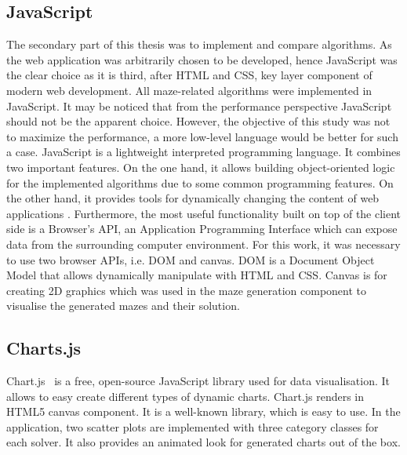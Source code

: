 \subsection{JavaScript}
The secondary part of this thesis was to implement and compare algorithms. As the web application was arbitrarily chosen to be developed, hence JavaScript was the 
clear choice as it is third, after HTML and CSS, key layer component of modern web development. All maze-related algorithms were implemented in JavaScript.
It may be noticed that from the performance perspective JavaScript should not be the apparent choice. However, the objective of this study was not to maximize
the performance, a more low-level language would be better for such a case. JavaScript is a lightweight interpreted programming language. 
It combines two important features. On the one hand, it allows building object-oriented logic for the implemented algorithms due to some common programming
features. On the other hand, it provides tools for dynamically changing the content of web applications \cite{29}. Furthermore, the most useful functionality built on top
of the client side is a Browser's API, an Application Programming Interface which can expose data from the surrounding computer environment. For this work, it was necessary to use two browser APIs, i.e. DOM and canvas. DOM is a Document Object Model that allows dynamically manipulate with HTML and CSS.
Canvas is for creating 2D graphics which was used in the maze generation component to visualise the generated mazes and their solution. 
\subsection{Charts.js}
Chart.js~\cite{30} is a free, open-source JavaScript library used for data visualisation. It allows to easy create different types of dynamic charts. Chart.js renders in 
HTML5 canvas component. It is a well-known library, which is easy to use. In the application, two scatter plots are implemented with three category classes 
for each solver. It also provides an animated look for generated charts out of the box.
